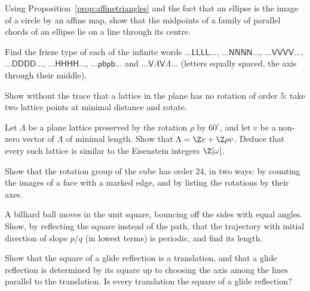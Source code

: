 \begin{exercise}[$\star$]\label{ex:affineellipse}
Using Proposition~\ref{prop:affinetriangles} and the fact that an ellipse is the image of a circle by an affine map, show that the midpoints
of a family of parallel chords of an ellipse lie on a line through its centre.
\end{exercise}

\begin{exercise}[$\star$]\label{ex:friezeid}
Find the frieze type of each of the infinite words
$\dots\mathsf{LLLL}\dots$, $\dots\mathsf{NNNN}\dots$, $\dots\mathsf{VVVV}\dots$, $\dots\mathsf{DDDD}\dots$, $\dots\mathsf{HHHH}\dots$,
$\dots\mathsf{pbpb}\dots$ and $\dots\mathsf{V\Lambda V\Lambda}\dots$ (letters equally spaced, the axis through their middle).
\end{exercise}

\begin{exercise}[$\star$]\label{ex:fivefold}
Show without the trace that a lattice in the plane has no rotation of order $5$: take two lattice points at minimal distance and
rotate.
\end{exercise}

\begin{exercise}[$\star\star$]\label{ex:hexagonal}
Let $\Lambda$ be a plane lattice preserved by the rotation $\rho$ by $60^\circ$, and let $v$ be a non-zero vector of $\Lambda$ of minimal
length. Show that $\Lambda=\Z v+\Z\rho v$. Deduce that every such lattice is similar to the Eisenstein integers $\Z[\omega]$.
\end{exercise}

\begin{exercise}[$\star\star$]\label{ex:cube}
Show that the rotation group of the cube has order $24$, in two ways: by counting the images of a face with a marked edge, and by listing the
rotations by their axes.
\end{exercise}

\begin{exercise}[$\star\star$]\label{ex:billiards}
A billiard ball moves in the unit square, bouncing off the sides with equal angles. Show, by reflecting the square instead of the path,
that the trajectory with initial direction of slope $p/q$ (in lowest terms) is periodic, and find its length.
\end{exercise}

\begin{exercise}[$\star$]\label{ex:glidesquare}
Show that the square of a glide reflection is a translation, and that a glide reflection is determined by its square up to choosing the
axis among the lines parallel to the translation. Is every translation the square of a glide reflection?
\end{exercise}

